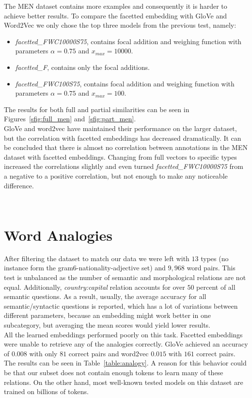 \noindent
The MEN dataset contains more examples and consequently it is harder to achieve better results. To compare the facetted embedding with GloVe and Word2Vec we only chose the top three models from the previous test, namely:
\begin{itemize}
\item \emph{facetted\_FWC10000S75}, contains focal addition and weighing function with parameters $\alpha=0.75$ and $x_{max}=10000$.
\item  \emph{facetted\_F}, contains only the focal additions.
\item \emph{facetted\_FWC100S75}, contains focal addition and weighing function with parameters $\alpha=0.75$ and $x_{max}=100$.
\end{itemize} 
The results for both full and partial similarities can be seen in Figures~\ref{sfig:full_men} and~\ref{sfig:part_men}. \\
GloVe and word2vec have maintained their performance on the larger dataset, but the correlation with facetted embeddings has decreased dramatically. It can be concluded that there is almost no correlation between annotations in the MEN dataset with facetted embeddings. Changing from full vectors to specific types increased the correlations slightly and even turned \emph{facetted\_FWC10000S75} from a negative to a positive correlation, but not enough to make any noticeable difference.


\
\section{Word Analogies}\label{sec:alanlogies}


\noindent
After filtering the dataset to match our data we were left with $13$ types (no instance form the  gram6-nationality-adjective set) and $9,968$ word pairs. This test is unbalanced as the number of semantic and morphological relations are not equal. Additionally, \emph{country:capital} relation accounts for over $50$ percent of all semantic questions. As a result, usually, the average accuracy for all semantic/syntactic questions is reported, which has a lot of variations between different parameters, because an embedding might work better in one subcategory, but averaging the mean scores would yield lower results.\\
All the learned embeddings performed poorly on this task. Facetted embeddings were unable to retrieve any of the analogies correctly. GloVe achieved an accuracy of $0.008$ with only $81$ correct pairs and word2vec $0.015$ with $161$ correct pairs. The results can be seen in Table~\ref{table:analogy}. A reason for this behavior could be that our subset does not contain enough tokens to learn many of these relations. On the other hand, most well-known tested models on this dataset are trained on billions of tokens. 

